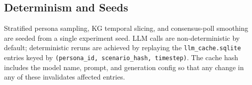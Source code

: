 \documentclass[11pt]{article}
\begin{document}
\subsection{Determinism and Seeds}

Stratified persona sampling, KG temporal slicing, and consensus-poll smoothing are seeded from a single experiment seed. LLM calls are non-deterministic by default; deterministic reruns are achieved by replaying the \texttt{llm\_cache.sqlite} entries keyed by \texttt{(persona\_id, scenario\_hash, timestep)}. The cache hash includes the model name, prompt, and generation config so that any change in any of these invalidates affected entries.
\end{document}
